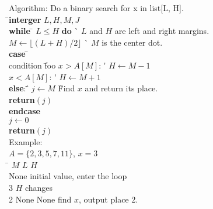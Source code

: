 \documentclass{article}
\begin{document}
        \newcommand\kw{\textbf}
        \begin{tabbing}
            
            \pushtabs
            Algorithm: Do a binary search for x in list[L, H]. \\
            \qquad\=\+\kw{interger} $L, H, M, J$\\
            \kw{while} \=\+ $L \leq H$ \kw{do} \` $L$ and $H$ are left and right margins. \\
                $M \gets \lfloor(L+H)/2\rfloor$ \` $M$ is the center dot. \\
                \kw{case} \=\+\\
                    condition \= foo \+\kill
                    $x > A[M]$: \' $H \gets M-1$ \\
                    $x < A[M]$: \' $H \gets M+1$ \\
                    \kw{else}: \' \= $j \gets M$ \` Find $x$ and return its place. \\
                        \> \kw{return}$(j)$ \\
                \<\< \kw{endcase} \-\-\-\\
            $j \gets 0$\\
            \kw{return}$(j)$ \-\\
            \poptabs
            Example: \\
            $A = \{2, 3, 5, 7, 11\}$, $x = 3$\\
            \qquad\=\+ $M$\qquad \= $L$\qquad \= $H$\qquad \= \\
                        None                        \> initial value, enter the loop \\
                        3                           \> $H$ changes \\
                        2        \> None      \> None       \> find $x$, output place 2. 
        \end{tabbing}
\end{document}
